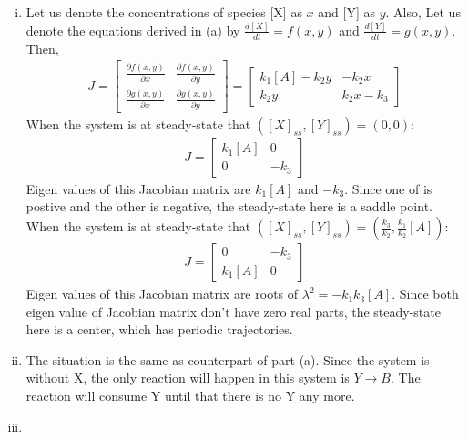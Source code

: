 \documentclass[paper=a4, fontsize=11pt]{scrartcl} %
\numberwithin{equation}{section} %
\numberwithin{figure}{section} %
\numberwithin{table}{section} %
\begin{document}
\begin{enumerate}[a)]
\begin{enumerate}[i)]
			\item
			Let us denote the concentrations of species [X] as $x$ and [Y] as $y$. Also, Let us denote the equations derived in (a) by $\frac{d[X]}{dt}=f(x,y)$ and $\frac{d[Y]}{dt}=g(x,y)$. Then,
			\begin{align*}
				J =
				\begin{bmatrix}
					\frac{\partial f(x,y)}{\partial x} &  \frac{\partial f(x,y)}{\partial y}\\
					\frac{\partial g(x,y)}{\partial x} &  \frac{\partial g(x,y)}{\partial y}
				\end{bmatrix}
				=
				\begin{bmatrix}
					k_1[A]-k_2y & -k_2x\\
					k_2y &  k_2x-k_3
				\end{bmatrix}
			\end{align*}
			When the system is at steady-state that $([X]_{ss},[Y]_{ss})=(0,0)$:
			\begin{align*}
				J =
				\begin{bmatrix}
					k_1[A] & 0\\
					0 &  -k_3
				\end{bmatrix}
			\end{align*}
			Eigen values of this Jacobian matrix are $k_1[A]$ and $-k_3$. Since one of is postive and the other is negative, the steady-state here is a saddle point. When the system is at steady-state that $([X]_{ss},[Y]_{ss})=(\frac{k_3}{k_2},\frac{k_1}{k_2}[A])$:
			\begin{align*}
				J =
				\begin{bmatrix}
					0 & -k_3\\
					k_1[A] &  0
				\end{bmatrix}
			\end{align*}
			Eigen values of this Jacobian matrix are roots of $\lambda^2=-k_1k_3[A]$. Since both eigen value of Jacobian matrix don't have zero real parts, the steady-state here is a center, which has periodic trajectories.

			\item

			The situation is the same as counterpart of part (a). Since the system is without X, the only reaction will happen in this system is $Y\rightarrow B$. The reaction will consume Y until that there is no Y any more.

			\item
		\end{enumerate}
	\end{enumerate}
\end{document}
